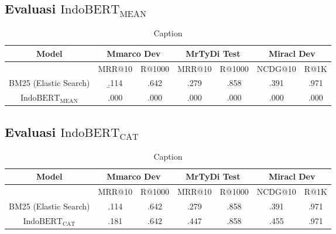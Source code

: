 \subsection{Evaluasi $\text{IndoBERT}_{\text{MEAN}}$}
\label{sec:resultindobertmean}

\begin{table}[!ht]
    \centering
    \caption{Caption}
    \label{tab:indobertmean}
    \begin{tabular}{|c|cc|cc|cc|} \hline
        Model                             & \multicolumn{2}{|c|}{Mmarco Dev} &
        \multicolumn{2}{|c|}{MrTyDi Test} & \multicolumn{2}{|c|}{Miracl Dev}                                             \\ \hline
                                          & MRR@10                           & R@1000 & MRR@10 & R@1000 & NCDG@10 & R@1K \\ \hline
        BM25 (Elastic Search)             & \b{.114}                         & .642   & .279   & .858   & .391    & .971 \\ \hline
        $\text{IndoBERT}_{\text{MEAN}}$   & .000                             & .000   & .000   & .000   & .000    & .000 \\ \hline
    \end{tabular}
\end{table}


\subsection{Evaluasi $\text{IndoBERT}_{\text{CAT}}$}
\label{sec:resultindobertcat}

\begin{table}
    \centering
    \caption{Caption}
    \label{tab:indobertcat}
    \begin{tabular}{|c|cc|cc|cc|} \hline
        Model                             & \multicolumn{2}{|c|}{Mmarco Dev} &
        \multicolumn{2}{|c|}{MrTyDi Test} & \multicolumn{2}{|c|}{Miracl Dev}                                             \\ \hline
                                          & MRR@10                           & R@1000 & MRR@10 & R@1000 & NCDG@10 & R@1K \\ \hline
        BM25 (Elastic Search)             & .114                             & .642   & .279   & .858   & .391    & .971 \\ \hline
        $\text{IndoBERT}_{\text{CAT}}$    & .181                             & .642   & .447   & .858   & .455    & .971 \\ \hline
    \end{tabular}
    \label{tab:my_label}
\end{table}


